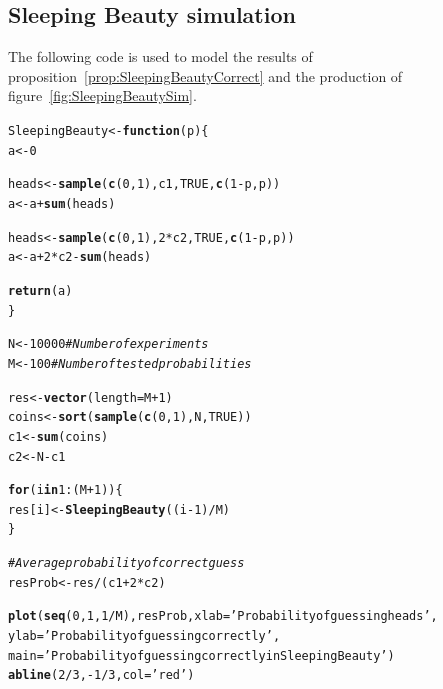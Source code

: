 \documentclass[twoside,a4paper]{article}
\makeatletter
\theoremstyle{plain}
\theoremstyle{definition}
\theoremstyle{remark}
\numberwithin{equation}{section}
\newcommand{\hlnum}[1]{\textcolor[rgb]{0.686,0.059,0.569}{#1}}%
\newcommand{\hlstr}[1]{\textcolor[rgb]{0.192,0.494,0.8}{#1}}%
\newcommand{\hlcom}[1]{\textcolor[rgb]{0.678,0.584,0.686}{\textit{#1}}}%
\newcommand{\hlopt}[1]{\textcolor[rgb]{0,0,0}{#1}}%
\newcommand{\hlstd}[1]{\textcolor[rgb]{0.345,0.345,0.345}{#1}}%
\newcommand{\hlkwa}[1]{\textcolor[rgb]{0.161,0.373,0.58}{\textbf{#1}}}%
\newcommand{\hlkwb}[1]{\textcolor[rgb]{0.69,0.353,0.396}{#1}}%
\newcommand{\hlkwc}[1]{\textcolor[rgb]{0.333,0.667,0.333}{#1}}%
\newcommand{\hlkwd}[1]{\textcolor[rgb]{0.737,0.353,0.396}{\textbf{#1}}}%
\newenvironment{kframe}{%
 \def\at@end@of@kframe{}%
 \ifinner\ifhmode%
  \def\at@end@of@kframe{\end{minipage}}%
  \begin{minipage}{\columnwidth}%
 \fi\fi%
 \def\FrameCommand##1{\hskip\@totalleftmargin \hskip-\fboxsep
 \colorbox{shadecolor}{##1}\hskip-\fboxsep
     \hskip-\linewidth \hskip-\@totalleftmargin \hskip\columnwidth}%
 \MakeFramed {\advance\hsize-\width
   \@totalleftmargin\z@ \linewidth\hsize
   \@setminipage}}%
 {\par\unskip\endMakeFramed%
 \at@end@of@kframe}
\newenvironment{knitrout}{}{} %
\DeclareMathOperator{\1}{\mathbbm{1}}
\makeatother
\begin{document}
\subsection{Sleeping Beauty simulation}\label{app:SleepingBeautySim}
The following code is used to model the results of proposition~\ref{prop:SleepingBeautyCorrect} and the production of figure~\ref{fig:SleepingBeautySim}.

\begin{knitrout}
\color{fgcolor}\begin{kframe}
\begin{alltt}
\hlstd{SleepingBeauty} \hlkwb{<-} \hlkwa{function}\hlstd{(}\hlkwc{p}\hlstd{) \{}
  \hlstd{a} \hlkwb{<-} \hlnum{0}

  \hlstd{heads} \hlkwb{<-} \hlkwd{sample}\hlstd{(}\hlkwd{c}\hlstd{(}\hlnum{0}\hlstd{,}\hlnum{1}\hlstd{), c1,} \hlnum{TRUE}\hlstd{,} \hlkwd{c}\hlstd{(}\hlnum{1}\hlopt{-}\hlstd{p,p))}
  \hlstd{a} \hlkwb{<-} \hlstd{a} \hlopt{+} \hlkwd{sum}\hlstd{(heads)}

  \hlstd{heads} \hlkwb{<-} \hlkwd{sample}\hlstd{(}\hlkwd{c}\hlstd{(}\hlnum{0}\hlstd{,}\hlnum{1}\hlstd{),} \hlnum{2}\hlopt{*}\hlstd{c2,} \hlnum{TRUE}\hlstd{,} \hlkwd{c}\hlstd{(}\hlnum{1}\hlopt{-}\hlstd{p,p))}
  \hlstd{a} \hlkwb{<-} \hlstd{a} \hlopt{+} \hlnum{2}\hlopt{*}\hlstd{c2}\hlopt{-}\hlkwd{sum}\hlstd{(heads)}

  \hlkwd{return}\hlstd{(a)}
\hlstd{\}}

\hlstd{N} \hlkwb{<-} \hlnum{10000} \hlcom{# Number of experiments}
\hlstd{M} \hlkwb{<-} \hlnum{100}   \hlcom{# Number of tested probabilities}

\hlstd{res} \hlkwb{<-} \hlkwd{vector}\hlstd{(}\hlkwc{length}\hlstd{=M}\hlopt{+}\hlnum{1}\hlstd{)}
\hlstd{coins} \hlkwb{<-} \hlkwd{sort}\hlstd{(}\hlkwd{sample}\hlstd{(}\hlkwd{c}\hlstd{(}\hlnum{0}\hlstd{,}\hlnum{1}\hlstd{), N,} \hlnum{TRUE}\hlstd{))}
\hlstd{c1} \hlkwb{<-} \hlkwd{sum}\hlstd{(coins)}
\hlstd{c2} \hlkwb{<-} \hlstd{N} \hlopt{-} \hlstd{c1}

\hlkwa{for} \hlstd{(i} \hlkwa{in} \hlnum{1}\hlopt{:}\hlstd{(M}\hlopt{+}\hlnum{1}\hlstd{)) \{}
  \hlstd{res[i]} \hlkwb{<-} \hlkwd{SleepingBeauty}\hlstd{((i}\hlopt{-}\hlnum{1}\hlstd{)}\hlopt{/}\hlstd{M)}
\hlstd{\}}

\hlcom{# Average probability of correct guess}
\hlstd{resProb} \hlkwb{<-} \hlstd{res} \hlopt{/} \hlstd{(c1} \hlopt{+} \hlnum{2}\hlopt{*}\hlstd{c2)}

\hlkwd{plot}\hlstd{(}\hlkwd{seq}\hlstd{(}\hlnum{0}\hlstd{,}\hlnum{1}\hlstd{,}\hlnum{1}\hlopt{/}\hlstd{M), resProb,} \hlkwc{xlab}\hlstd{=}\hlstr{'Probability of guessing heads'}\hlstd{,}
     \hlkwc{ylab}\hlstd{=}\hlstr{'Probability of guessing correctly'}\hlstd{,}
     \hlkwc{main}\hlstd{=}\hlstr{'Probability of guessing correctly in Sleeping Beauty'}\hlstd{)}
\hlkwd{abline}\hlstd{(}\hlnum{2}\hlopt{/}\hlnum{3}\hlstd{,}\hlopt{-}\hlnum{1}\hlopt{/}\hlnum{3}\hlstd{,} \hlkwc{col}\hlstd{=}\hlstr{'red'}\hlstd{)}
\end{alltt}
\end{kframe}
\end{knitrout}
\end{document}
